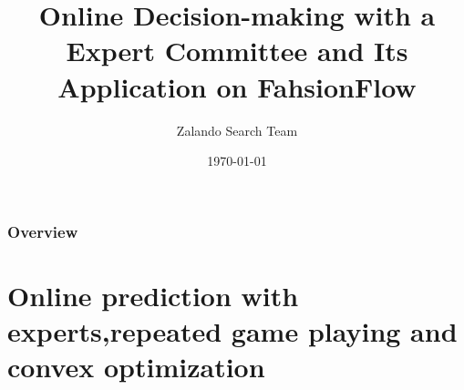 \documentclass{beamer}
\title[Online Decision-making]{Online Decision-making with a Expert Committee and Its Application on FahsionFlow} %
\author{Zalando Search Team} %
\institute[Zalando SE] %
{
Zalando SE \\ %
\medskip
\textit{hanchen.xiong@zalando.de} %
}
\date{\today} %
\begin{document}
\begin{frame}
\titlepage %
\end{frame}

\begin{frame}
\frametitle{Overview} %
\tableofcontents %
\end{frame}


\section[Online prediction with experts, games, convex optimization]{Online prediction with experts,repeated game playing and convex optimization}        %
\end{document}
